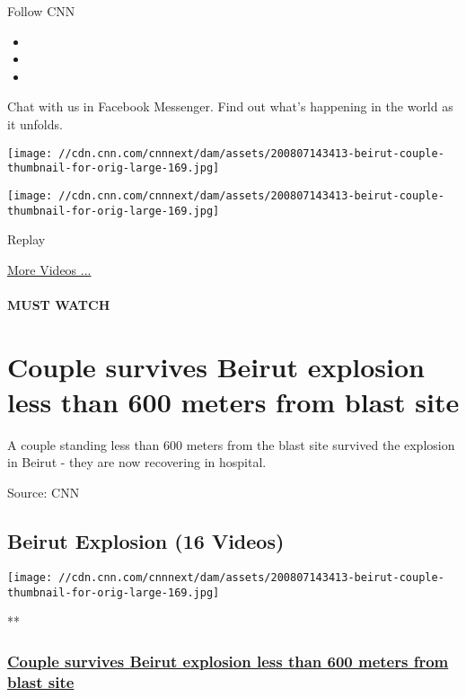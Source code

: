Follow CNN

\begin{itemize}
\item
\item
\item
\end{itemize}

Chat with us in Facebook Messenger. Find out what's happening in the
world as it unfolds.

\texttt{[image: //cdn.cnn.com/cnnnext/dam/assets/200807143413-beirut-couple-thumbnail-for-orig-large-169.jpg]}

\texttt{[image: //cdn.cnn.com/cnnnext/dam/assets/200807143413-beirut-couple-thumbnail-for-orig-large-169.jpg]}\href{javascript:void(0);}{}

Replay

\href{/videos}{More Videos ...}

\hypertarget{must-watch}{%
\paragraph{MUST WATCH}\label{must-watch}}

\hypertarget{couple-survives-beirut-explosion-less-than-600-meters-from-blast-site}{%
\section{Couple survives Beirut explosion less than 600 meters from
blast
site}\label{couple-survives-beirut-explosion-less-than-600-meters-from-blast-site}}

A couple standing less than 600 meters from the blast site survived the
explosion in Beirut - they are now recovering in hospital.

Source: CNN

\hypertarget{beirut-explosion-16-videos}{%
\subsection{Beirut Explosion (16
Videos)}\label{beirut-explosion-16-videos}}

\href{/videos/world/2020/08/07/beirut-explosion-survivors-lon-orig-bks.cnn/video/playlists/beirut-explosion/}{}

\texttt{[image: //cdn.cnn.com/cnnnext/dam/assets/200807143413-beirut-couple-thumbnail-for-orig-large-169.jpg]}

**

\hypertarget{couple-survives-beirut-explosion-less-than-600-meters-from-blast-site-1}{%
\subsubsection{\texorpdfstring{\href{/videos/world/2020/08/07/beirut-explosion-survivors-lon-orig-bks.cnn/video/playlists/beirut-explosion/}{Couple
survives Beirut explosion less than 600 meters from blast
site}}{Couple survives Beirut explosion less than 600 meters from blast site}}\label{couple-survives-beirut-explosion-less-than-600-meters-from-blast-site-1}}

